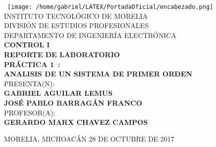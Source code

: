 \newcommand{\materia}{\uppercase{Control I}}
\newcommand{\maestro}{\uppercase{Gerardo Marx Chavez Campos}}

\newcommand{\tipoDoc}{\uppercase{REPORTE DE LABORATORIO}} %
\newcommand{\nombreDoc}{\uppercase{Práctica 1}} 
\newcommand{\docNum}{}
\newcommand{\subNombreDoc}{\uppercase{Analisis de un sistema de primer orden}}

\newcommand{\alumnos}{\uppercase{GABRIEL AGUILAR LEMUS \\ José Pablo Barragán Franco}}
\newcommand{\fecha}{\uppercase{28 de octubre de 2017}}

\begin{center}
	\
	\texttt{[image: /home/gabriel/LATEX/PortadaOficial/encabezado.png]}
	\huge INSTITUTO TECNOLÓGICO DE MORELIA \\
	\vfill
	\large DIVISIÓN DE ESTUDIOS PROFESIONALES  \\
	\vfill
	\large  DEPARTAMENTO DE INGENIERÍA ELECTRÓNICA \\ 
	\vfill
	\Large \textbf \materia \\
	\vfill
	\textbf{\tipoDoc} \\
	\vfill 
	\LARGE  \textbf{ \nombreDoc  \, \docNum: \\ \subNombreDoc} \\
	\vfill
	\large PRESENTA(N): \\
	\LARGE  \textbf{\alumnos} \\
	\vfill
	\large PROFESOR(A): \\
	\Large \textbf{\maestro }
	\vfill 
	\begin{flushleft}
		MORELIA, MICHOACÁN \hfill \uppercase{\fecha}
	\end{flushleft}
	\pagebreak
\end{center}